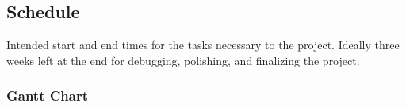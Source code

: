 \subsection{Schedule}
	Intended start and end times for the tasks necessary to the project. Ideally three weeks left at the end for debugging, polishing, and finalizing the project.
	\subsubsection{Gantt Chart}
